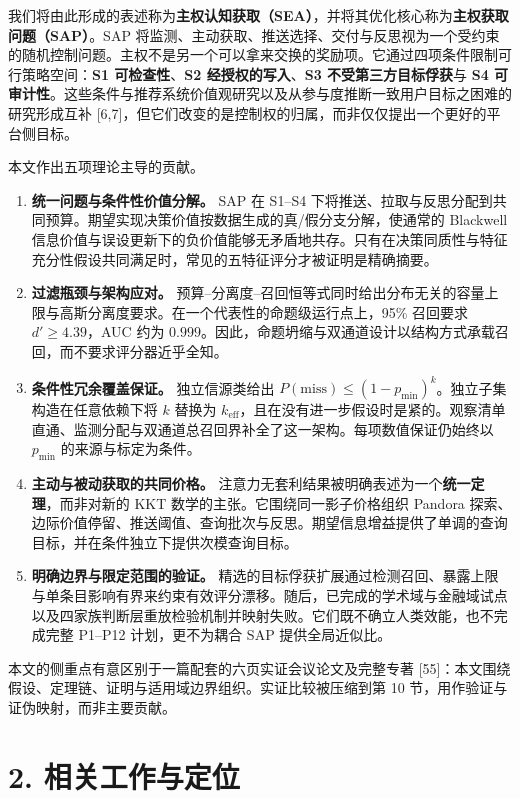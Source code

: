 \documentclass[
  chinese,
  11pt]{article}
\providecommand{\tightlist}{%
  \setlength{\itemsep}{0pt}\setlength{\parskip}{0pt}}
\begin{document}
我们将由此形成的表述称为\textbf{主权认知获取（SEA）}，并将其优化核心称为\textbf{主权获取问题（SAP）}。SAP 将监测、主动获取、推送选择、交付与反思视为一个受约束的随机控制问题。主权不是另一个可以拿来交换的奖励项。它通过四项条件限制可行策略空间：\textbf{S1 可检查性}、\textbf{S2 经授权的写入}、\textbf{S3 不受第三方目标俘获}与 \textbf{S4 可审计性}。这些条件与推荐系统价值观研究以及从参与度推断一致用户目标之困难的研究形成互补 {[}6,7{]}，但它们改变的是控制权的归属，而非仅仅提出一个更好的平台侧目标。

本文作出五项理论主导的贡献。

\begin{enumerate}
\def\labelenumi{\arabic{enumi}.}
\tightlist
\item
  \textbf{统一问题与条件性价值分解。} SAP 在 S1--S4 下将推送、拉取与反思分配到共同预算。期望实现决策价值按数据生成的真/假分支分解，使通常的 Blackwell 信息价值与误设更新下的负价值能够无矛盾地共存。只有在决策同质性与特征充分性假设共同满足时，常见的五特征评分才被证明是精确摘要。
\item
  \textbf{过滤瓶颈与架构应对。} 预算--分离度--召回恒等式同时给出分布无关的容量上限与高斯分离度要求。在一个代表性的命题级运行点上，95\% 召回要求 \(d'\geq4.39\)，AUC 约为 \(0.999\)。因此，命题坍缩与双通道设计以结构方式承载召回，而不要求评分器近乎全知。
\item
  \textbf{条件性冗余覆盖保证。} 独立信源类给出 \(P(\mathrm{miss})\leq(1-p_{\min})^k\)。独立子集构造在任意依赖下将 \(k\) 替换为 \(k_{\mathrm{eff}}\)，且在没有进一步假设时是紧的。观察清单直通、监测分配与双通道总召回界补全了这一架构。每项数值保证仍始终以 \(p_{\min}\) 的来源与标定为条件。
\item
  \textbf{主动与被动获取的共同价格。} 注意力无套利结果被明确表述为一个\textbf{统一定理}，而非对新的 KKT 数学的主张。它围绕同一影子价格组织 Pandora 探索、边际价值停留、推送阈值、查询批次与反思。期望信息增益提供了单调的查询目标，并在条件独立下提供次模查询目标。
\item
  \textbf{明确边界与限定范围的验证。} 精选的目标俘获扩展通过检测召回、暴露上限与单条目影响有界来约束有效评分漂移。随后，已完成的学术域与金融域试点以及四家族判断层重放检验机制并映射失败。它们既不确立人类效能，也不完成完整 P1--P12 计划，更不为耦合 SAP 提供全局近似比。
\end{enumerate}

本文的侧重点有意区别于一篇配套的六页实证会议论文及完整专著 {[}55{]}：本文围绕假设、定理链、证明与适用域边界组织。实证比较被压缩到第 10 节，用作验证与证伪映射，而非主要贡献。

\section{2. 相关工作与定位}\label{ux76f8ux5173ux5de5ux4f5cux4e0eux5b9aux4f4d}
\end{document}
